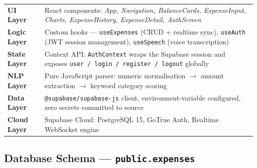 \documentclass[a4paper,10pt]{article}
\begin{document}
\begin{tcolorbox}[cyanbox]
{\small
\begin{tabular}{@{}p{2.6cm}p{12.8cm}@{}}
  {\color{ncyan}\bfseries UI Layer} &
    React components: \textit{App, Navigation, BalanceCards, ExpenseInput,
    Charts, ExpenseHistory, ExpenseDetail, AuthScreen} \\[3pt]
  {\color{ncyan}\bfseries Logic Layer} &
    Custom hooks --- \texttt{useExpenses} (CRUD + realtime sync),
    \texttt{useAuth} (JWT session management),
    \texttt{useSpeech} (voice transcription) \\[3pt]
  {\color{ncyan}\bfseries State Layer} &
    Context API: \texttt{AuthContext} wraps the Supabase session and
    exposes \texttt{user / login / register / logout} globally \\[3pt]
  {\color{ncyan}\bfseries NLP Layer} &
    Pure JavaScript parser: numeric normalisation
    $\rightarrow$ amount extraction $\rightarrow$ keyword category scoring \\[3pt]
  {\color{ncyan}\bfseries Data Layer} &
    \texttt{@supabase/supabase-js} client, environment-variable configured,
    zero secrets committed to source \\[3pt]
  {\color{ncyan}\bfseries Cloud Layer} &
    Supabase Cloud: PostgreSQL 15, GoTrue Auth, Realtime WebSocket engine \\
\end{tabular}
}
\end{tcolorbox}

\vspace{6pt}

\subsection{Database Schema --- \texttt{public.expenses}}
\end{document}
